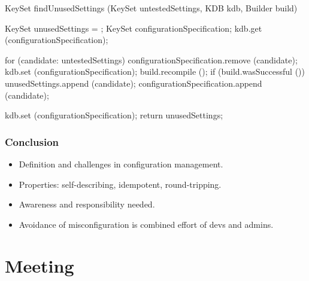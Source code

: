 \begin{frame}[fragile]
	\small
	\fontsize{10}{0}\selectfont
	\begin{code}[gobble=4,language=Cpp]
	KeySet findUnusedSettings (KeySet untestedSettings,
				   KDB kdb,
				   Builder build)
	{
	   KeySet unusedSettings = {};
	   KeySet configurationSpecification;
	   kdb.get (configurationSpecification);

	   for (candidate: untestedSettings)
	   {
	       configurationSpecification.remove (candidate);
	       kdb.set (configurationSpecification);
	       build.recompile ();
	       if (build.wasSuccessful ())
	       {
	          unusedSettings.append (candidate);
	       }
	       configurationSpecification.append (candidate);
	   }

	   kdb.set (configurationSpecification);
	   return unusedSettings;
	}
	\end{code}
\end{frame}

\begin{frame}
	\frametitle{Conclusion}

	\begin{itemize}[<+-| alert@+>]
	\item Definition and challenges in configuration management.
	\item Properties: self-describing, idempotent, round-tripping.
	\item Awareness and responsibility needed.
	\item Avoidance of misconfiguration is combined effort of devs and admins.
	\end{itemize}
\end{frame}


\section{Meeting}

